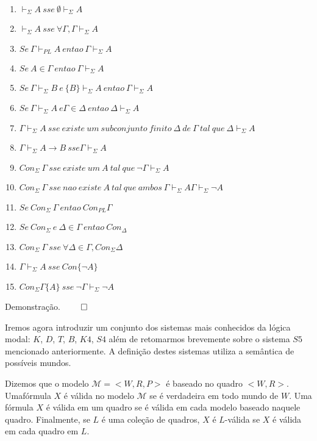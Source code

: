 \begin{theorem} ~
    \begin{enumerate}
        \item $\vdash_{\Sigma}A\ sse\ \emptyset \vdash_{\Sigma}A$
        \item $\vdash_{\Sigma}A\ sse\ \forall \Gamma, \Gamma \vdash_{\Sigma}A$
        \item $Se\ \Gamma \vdash_{PL}A\ entao\ \Gamma \vdash_{\Sigma}A$
        \item $Se\ A\in \Gamma\ entao\ \Gamma \vdash_{\Sigma}A$ \item $Se\ \Gamma
            \vdash_{\Sigma}B\ e\ \{B\}\vdash_{\Sigma}A\ entao\ \Gamma
            \vdash_{\Sigma}A$
        \item $Se\ \Gamma \vdash_{\Sigma}A\ e \Gamma \in \Delta\ entao\ \Delta
            \vdash_{\Sigma} A$
        \item $\Gamma \vdash_{\Sigma}A\ sse\ existe\ um\ subconjunto\ finito\ 
            \Delta\ de\ \Gamma\ tal\ que\ \Delta \vdash_{\Sigma}A$
        \item $\Gamma \vdash_{\Sigma}A\rightarrow B\ sse \Gamma \vdash_{\Sigma}A$
        \item $Con_{\Sigma}\ \Gamma\ sse\ existe\ um\ A\ tal\ que\ \neg \Gamma \vdash_{\Sigma}A$
        \item $Con_{\Sigma}\ \Gamma\ sse\ nao\ existe\ A\ tal\ que\ ambos\ \Gamma
            \vdash_{\Sigma}A \Gamma \vdash_{\Sigma}\neg A$
        \item $Se\ Con_{\Sigma}\ \Gamma\ entao\ Con_{PL}\Gamma$
        \item $Se\ Con_{\Sigma}\ e\ \Delta \in \Gamma\ entao\ Con_{\Delta}$
        \item $Con_{\Sigma}\ \Gamma\ sse\ \forall \Delta \in \Gamma,
            Con_{\Sigma}\Delta$
        \item $\Gamma \vdash_{\Sigma}A\ sse\ Con\{\neg A\}$
        \item $Con_{\Sigma}\Gamma \{A\}\ sse\ \neg \Gamma \vdash_{\Sigma}\neg A$
    \end{enumerate}
\end{theorem}

Demonstração. $\qed$

Iremos agora introduzir um conjunto dos sistemas mais conhecidos da lógica
modal: $K$, $D$, $T$, $B$, $K4$, $S4$ além de retomarmos brevemente sobre o
sistema $S5$ mencionado anteriormente. A definição destes sistemas utiliza a
semântica de possíveis mundos.

\begin{definition}[$L$-Válida]
    Dizemos que o modelo $\mathcal{M} = <W, R, P>$ é baseado no quadro $<W,R>$.
    Umafórmula $X$ é válida no modelo $\mathcal{M}$ se é verdadeira em todo
    mundo de $W$. Uma fórmula $X$ é válida em um quadro se é válida em cada
    modelo baseado naquele quadro. Finalmente, se $L$ é uma coleção de quadros,
    $X$ é $L$-válida se $X$ é válida em cada quadro em $L$.
\end{definition}


